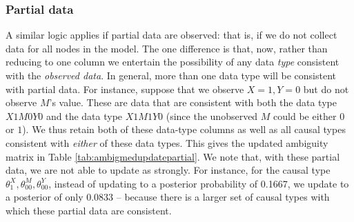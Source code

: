 \documentclass[
  12pt,
]{book}
\begin{document}
\hypertarget{partial-data}{%
\subsubsection{Partial data}\label{partial-data}}

A similar logic applies if partial data are observed: that is, if we do not collect data for all nodes in the model. The one difference is that, now, rather than reducing to one column we entertain the possibility of any data \emph{type} consistent with the \emph{observed data}. In general, more than one data type will be consistent with partial data. For instance, suppose that we observe \(X=1, Y=0\) but do not observe \(M\)'s value. These are data that are consistent with both the data type \(X1M0Y0\) and the data type \(X1M1Y0\) (since the unobserved \(M\) could be either \(0\) or \(1\)). We thus retain both of these data-type columns as well as all causal types consistent with \emph{either} of these data types. This gives the updated ambiguity matrix in Table \ref{tab:ambigmedupdatepartial}. We note that, with these partial data, we are not able to update as strongly. For instance, for the causal type \(\theta^X_1,\theta^M_{00},\theta^Y_{00}\), instead of updating to a posterior probability of 0.1667, we update to a posterior of only 0.0833 -- because there is a larger set of causal types with which these partial data are consistent.
\end{document}
